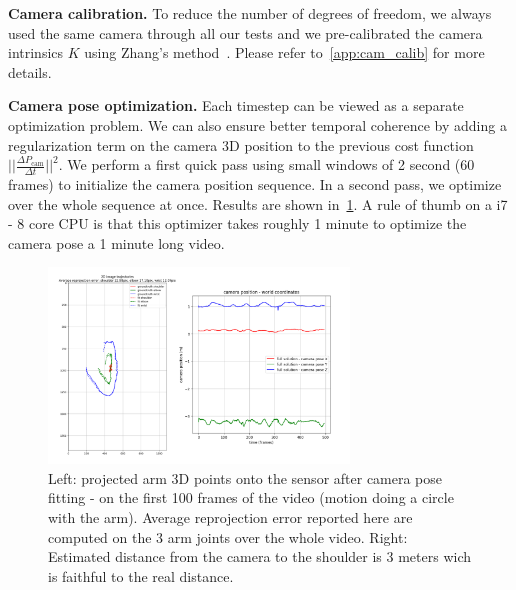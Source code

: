 \noindent\textbf{Camera calibration.} To reduce the number of degrees of freedom, we always used the same camera through all our tests and 
we pre-calibrated the camera intrinsics $K$ using Zhang's method~\cite{Zhang00calib}.
Please refer to~\cref{app:cam_calib} for more details.

\noindent\textbf{Camera pose optimization.}
Each timestep can be viewed as a separate optimization problem. We can also ensure better temporal coherence
by adding a regularization term on the camera 3D position to the previous cost function $||\frac{\Delta P_{\text{cam}}}{\Delta{t}}||^2$.
We perform a first quick pass using small windows of 2 second (60 frames) to initialize the camera position sequence.
In a second pass, we optimize over the whole sequence at once.
Results are shown in~\cref{fig:camera_fitting}.
A rule of thumb on a i7 - 8 core CPU is that this optimizer takes roughly 1 minute to optimize the camera pose a 1 minute long video.

\begin{figure}
    \centering
    \includegraphics[width=8cm]{figures/camera_pose_fitting_collage.png}
    \caption{Left: projected arm 3D points onto the sensor after camera pose fitting - on the first 100 frames of the video (motion doing a circle with the arm). Average reprojection error reported here are computed on the 3 arm joints over the whole video.
    Right: Estimated distance from the camera to the shoulder is 3 meters wich is faithful to the real distance.}
    \label{fig:camera_fitting}
\end{figure}

